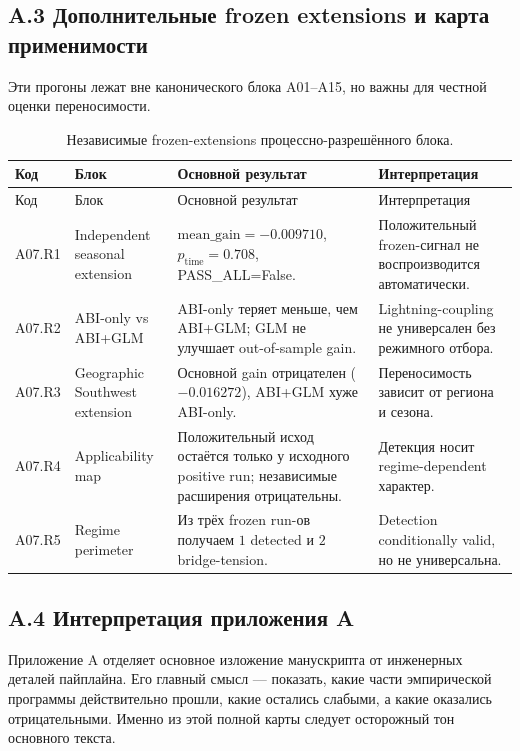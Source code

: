 \documentclass[11pt,a4paper]{article}
\theoremstyle{definition}
\theoremstyle{plain}
\theoremstyle{remark}
\begin{document}
\subsection*{A.3 Дополнительные frozen extensions и карта применимости}

Эти прогоны лежат вне канонического блока A01--A15, но важны для честной оценки переносимости.

{\small
\begin{longtable}{@{}p{1.5cm}p{3.2cm}p{5.1cm}p{3.4cm}@{}}
\caption{Независимые frozen-extensions процессно-разрешённого блока.}\label{tab:appendix_a_extensions}\\
\toprule
Код & Блок & Основной результат & Интерпретация \\
\midrule
\endfirsthead
\toprule
Код & Блок & Основной результат & Интерпретация \\
\midrule
\endhead
A07.R1 & Independent seasonal extension & $\mathrm{mean\_gain}=-0.009710$, $p_{\mathrm{time}}=0.708$, PASS\_ALL=False. & Положительный frozen-сигнал не воспроизводится автоматически. \\
A07.R2 & ABI-only vs ABI+GLM & ABI-only теряет меньше, чем ABI+GLM; GLM не улучшает out-of-sample gain. & Lightning-coupling не универсален без режимного отбора. \\
A07.R3 & Geographic Southwest extension & Основной gain отрицателен ($-0.016272$), ABI+GLM хуже ABI-only. & Переносимость зависит от региона и сезона. \\
A07.R4 & Applicability map & Положительный исход остаётся только у исходного positive run; независимые расширения отрицательны. & Детекция носит regime-dependent характер. \\
A07.R5 & Regime perimeter & Из трёх frozen run-ов получаем $1$ detected и $2$ bridge-tension. & Detection conditionally valid, но не универсальна. \\
\bottomrule
\end{longtable}
}

\subsection*{A.4 Интерпретация приложения A}

Приложение A отделяет основное изложение манускрипта от инженерных деталей пайплайна.
Его главный смысл --- показать, какие части эмпирической программы действительно прошли,
какие остались слабыми, а какие оказались отрицательными.
Именно из этой полной карты следует осторожный тон основного текста.


\printbibliography
\end{document}
